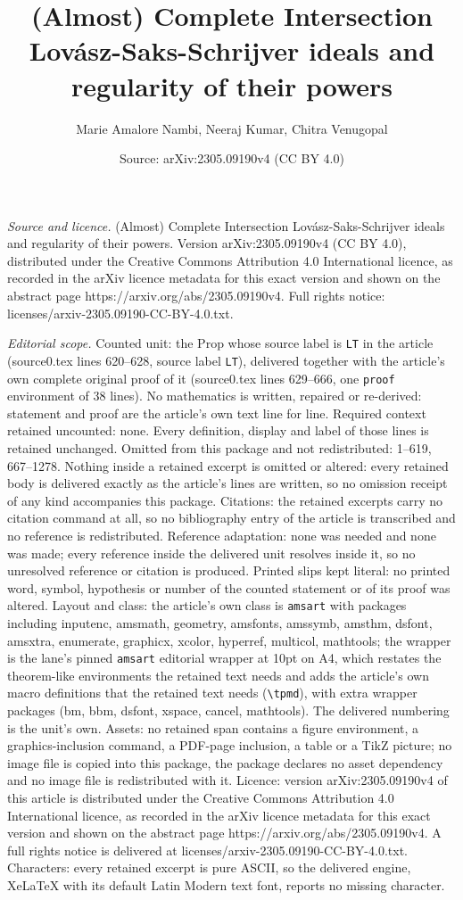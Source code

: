 \documentclass[10pt,a4paper]{amsart}
\title[(Almost) Complete Intersection Lov\'{a}sz-Saks-Schrijver ide]{(Almost) Complete Intersection Lov\'{a}sz-Saks-Schrijver ideals and regularity of their powers}
\author{Marie Amalore Nambi, Neeraj Kumar, Chitra Venugopal}
\date{Source: arXiv:2305.09190v4 (CC BY 4.0)}
\begin{document}
\maketitle

\noindent\emph{Source and licence.} (Almost) Complete Intersection Lov\'{a}sz-Saks-Schrijver ideals and regularity of their powers. Version arXiv:2305.09190v4 (CC BY 4.0), distributed under the Creative Commons Attribution 4.0 International licence, as recorded in the arXiv licence metadata for this exact version and shown on the abstract page https://arxiv.org/abs/2305.09190v4. Full rights notice: licenses/arxiv-2305.09190-CC-BY-4.0.txt.\par\smallskip

\noindent\textit{Editorial scope.} Counted unit: the Prop whose source label is \texttt{LT} in the article (source0.tex lines 620--628, source label \texttt{LT}), delivered together with the article's own complete original proof of it (source0.tex lines 629--666, one \texttt{proof} environment of 38 lines). No mathematics is written, repaired or re-derived: statement and proof are the article's own text line for line. Required context retained uncounted: none. Every definition, display and label of those lines is retained unchanged. Omitted from this package and not redistributed: 1--619, 667--1278. Nothing inside a retained excerpt is omitted or altered: every retained body is delivered exactly as the article's lines are written, so no omission receipt of any kind accompanies this package. Citations: the retained excerpts carry no citation command at all, so no bibliography entry of the article is transcribed and no reference is redistributed. Reference adaptation: none was needed and none was made; every reference inside the delivered unit resolves inside it, so no unresolved reference or citation is produced. Printed slips kept literal: no printed word, symbol, hypothesis or number of the counted statement or of its proof was altered. Layout and class: the article's own class is \texttt{amsart} with packages including inputenc, amsmath, geometry, amsfonts, amssymb, amsthm, dsfont, amsxtra, enumerate, graphicx, xcolor, hyperref, multicol, mathtools; the wrapper is the lane's pinned \texttt{amsart} editorial wrapper at 10pt on A4, which restates the theorem-like environments the retained text needs and adds the article's own macro definitions that the retained text needs (\texttt{\textbackslash tpmd}), with extra wrapper packages (bm, bbm, dsfont, xspace, cancel, mathtools). The delivered numbering is the unit's own. Assets: no retained span contains a figure environment, a graphics-inclusion command, a PDF-page inclusion, a table or a TikZ picture; no image file is copied into this package, the package declares no asset dependency and no image file is redistributed with it. Licence: version arXiv:2305.09190v4 of this article is distributed under the Creative Commons Attribution 4.0 International licence, as recorded in the arXiv licence metadata for this exact version and shown on the abstract page https://arxiv.org/abs/2305.09190v4. A full rights notice is delivered at licenses/arxiv-2305.09190-CC-BY-4.0.txt. Characters: every retained excerpt is pure ASCII, so the delivered engine, XeLaTeX with its default Latin Modern text font, reports no missing character.
\end{document}
